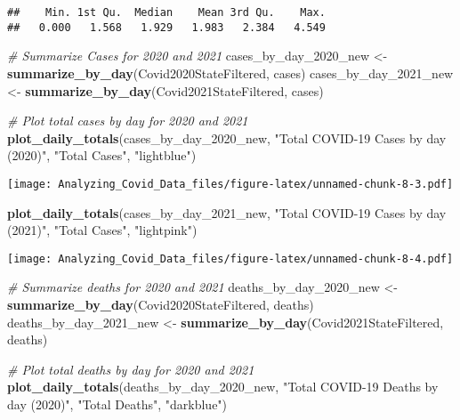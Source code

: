 \documentclass[
]{article}
\newenvironment{Shaded}{\begin{snugshade}}{\end{snugshade}}
\newcommand{\CommentTok}[1]{\textcolor[rgb]{0.56,0.35,0.01}{\textit{#1}}}
\newcommand{\ConstantTok}[1]{\textcolor[rgb]{0.56,0.35,0.01}{#1}}
\newcommand{\FunctionTok}[1]{\textcolor[rgb]{0.13,0.29,0.53}{\textbf{#1}}}
\newcommand{\NormalTok}[1]{#1}
\newcommand{\OtherTok}[1]{\textcolor[rgb]{0.56,0.35,0.01}{#1}}
\newcommand{\SpecialCharTok}[1]{\textcolor[rgb]{0.81,0.36,0.00}{\textbf{#1}}}
\newcommand{\StringTok}[1]{\textcolor[rgb]{0.31,0.60,0.02}{#1}}
\begin{document}
\begin{Shaded}
\end{Shaded}

\begin{verbatim}
##    Min. 1st Qu.  Median    Mean 3rd Qu.    Max. 
##   0.000   1.568   1.929   1.983   2.384   4.549
\end{verbatim}

\begin{Shaded}
\begin{Highlighting}[]
\CommentTok{\# Summarize Cases for 2020 and 2021}
\NormalTok{cases\_by\_day\_2020\_new }\OtherTok{\textless{}{-}} \FunctionTok{summarize\_by\_day}\NormalTok{(Covid2020StateFiltered, cases)}
\NormalTok{cases\_by\_day\_2021\_new }\OtherTok{\textless{}{-}} \FunctionTok{summarize\_by\_day}\NormalTok{(Covid2021StateFiltered, cases)}

\CommentTok{\# Plot total cases by day for 2020 and 2021}
\FunctionTok{plot\_daily\_totals}\NormalTok{(cases\_by\_day\_2020\_new, }\StringTok{"Total COVID{-}19 Cases by day (2020)"}\NormalTok{, }\StringTok{"Total Cases"}\NormalTok{, }\StringTok{"lightblue"}\NormalTok{)}
\end{Highlighting}
\end{Shaded}

\texttt{[image: Analyzing\_Covid\_Data\_files/figure-latex/unnamed-chunk-8-3.pdf]}

\begin{Shaded}
\begin{Highlighting}[]
\FunctionTok{plot\_daily\_totals}\NormalTok{(cases\_by\_day\_2021\_new, }\StringTok{"Total COVID{-}19 Cases by day (2021)"}\NormalTok{, }\StringTok{"Total Cases"}\NormalTok{, }\StringTok{"lightpink"}\NormalTok{)}
\end{Highlighting}
\end{Shaded}

\texttt{[image: Analyzing\_Covid\_Data\_files/figure-latex/unnamed-chunk-8-4.pdf]}

\begin{Shaded}
\begin{Highlighting}[]
\CommentTok{\# Summarize deaths for 2020 and 2021}
\NormalTok{deaths\_by\_day\_2020\_new }\OtherTok{\textless{}{-}} \FunctionTok{summarize\_by\_day}\NormalTok{(Covid2020StateFiltered, deaths)}
\NormalTok{deaths\_by\_day\_2021\_new }\OtherTok{\textless{}{-}} \FunctionTok{summarize\_by\_day}\NormalTok{(Covid2021StateFiltered, deaths)}

\CommentTok{\# Plot total deaths by day for 2020 and 2021}
\FunctionTok{plot\_daily\_totals}\NormalTok{(deaths\_by\_day\_2020\_new, }\StringTok{"Total COVID{-}19 Deaths by day (2020)"}\NormalTok{, }\StringTok{"Total Deaths"}\NormalTok{, }\StringTok{"darkblue"}\NormalTok{)}
\end{Highlighting}
\end{Shaded}
\end{document}
